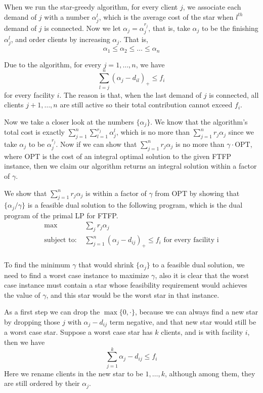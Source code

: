 \documentclass[11pt]{article}
\begin{document}
When we run the star-greedy algorithm, for every client $j$,
we associate each demand of $j$ with a number $\alpha_j^l$,
which is the average cost of the star when $l^{th}$ demand
of $j$ is connected. Now we let $\alpha_j = \alpha_j^{r_j}$,
that is, take $\alpha_j$ to be the finishing $\alpha_j^l$,
and order clients by increasing $\alpha_j$. That is,
\begin{equation*}
  \alpha_1 \leq \alpha_2 \leq \ldots \leq \alpha_n
\end{equation*}

Due to the algorithm, for every $j=1,\ldots,n$, we have
\begin{equation*}
  \sum_{l=j}^n (\alpha_j - d_{il})_+ \leq f_i
\end{equation*}
for every facility $i$.  The reason is that, when the last
demand of $j$ is connected, all clients $j+1,\ldots,n$ are
still active so their total contribution cannot exceed
$f_i$.

Now we take a closer look at the numbers $\{\alpha_j\}$. We
know that the algorithm's total cost is exactly
$\sum_{j=1}^n \sum_{l=1}^{r_j} \alpha_j^l$, which is no more
than $\sum_{j=1}^n r_j \alpha_j$ since we take $\alpha_j$ to
be $\alpha_j^{r_j}$. Now if we can show that $\sum_{j=1}^n
r_j \alpha_j$ is no more than $\gamma \cdot \textrm{OPT}$,
where $\textrm{OPT}$ is the cost of an integral optimal
solution to the given FTFP instance, then we claim our
algorithm returns an integral solution within a factor of
$\gamma$.

We show that $\sum_{j=1}^n r_j \alpha_j$ is within a factor
of $\gamma$ from $\textrm{OPT}$ by showing that
$\{\alpha_j/\gamma\}$ is a feasible dual solution to the
following program, which is the dual program of the primal
LP for FTFP.
\begin{align*}
  \max\; &\sum_j r_j\alpha_j\\
  \textrm{subject to: }& \sum_{j=1}^n (\alpha_j - d_{ij})_+
  \leq f_i \textrm{ for every facility i}\\
\end{align*}

To find the minimum $\gamma$ that would shrink
$\{\alpha_j\}$ to a feasible dual solution, we need to find
a worst case instance to maximize $\gamma$, also it is clear
that the worst case instance must contain a star whose
feasibility requirement would achieves the value of
$\gamma$, and this star would be the worst star in that
instance.

As a first step we can drop the $\max\{0, \cdot\}$, because
we can always find a new star by dropping those $j$ with
$\alpha_j - d_{ij}$ term negative, and that new star would
still be a worst case star. Suppose a worst case star has
$k$ clients, and is with facility $i$, then we have
\begin{equation*}
  \sum_{j=1}^k \alpha_j - d_{ij} \leq f_i
\end{equation*}
Here we rename clients in the new star to be $1,\ldots,k$,
although among them, they are still ordered by their
$\alpha_j$.
\end{document}
